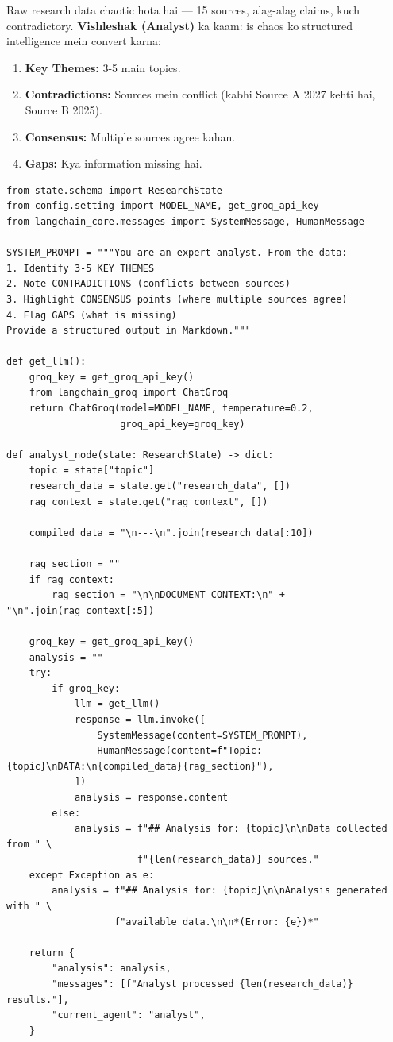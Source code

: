 \documentclass[11pt, a4paper]{article}
\begin{document}
\begin{storybox}
Raw research data chaotic hota hai --- 15 sources, alag-alag claims, kuch contradictory. \textbf{Vishleshak (Analyst)} ka kaam: is chaos ko structured intelligence mein convert karna:

\begin{enumerate}[label=\textcolor{accentpurple}{\arabic*.}]
\item \textbf{Key Themes:} 3-5 main topics.
\item \textbf{Contradictions:} Sources mein conflict (kabhi Source A 2027 kehti hai, Source B 2025).
\item \textbf{Consensus:} Multiple sources agree kahan.
\item \textbf{Gaps:} Kya information missing hai.
\end{enumerate}
\end{storybox}

\begin{lstlisting}[style=pythonstyle, caption={agents/analyst.py --- Poora Code}]
from state.schema import ResearchState
from config.setting import MODEL_NAME, get_groq_api_key
from langchain_core.messages import SystemMessage, HumanMessage

SYSTEM_PROMPT = """You are an expert analyst. From the data:
1. Identify 3-5 KEY THEMES
2. Note CONTRADICTIONS (conflicts between sources)
3. Highlight CONSENSUS points (where multiple sources agree)
4. Flag GAPS (what is missing)
Provide a structured output in Markdown."""

def get_llm():
    groq_key = get_groq_api_key()
    from langchain_groq import ChatGroq
    return ChatGroq(model=MODEL_NAME, temperature=0.2,
                    groq_api_key=groq_key)

def analyst_node(state: ResearchState) -> dict:
    topic = state["topic"]
    research_data = state.get("research_data", [])
    rag_context = state.get("rag_context", [])

    compiled_data = "\n---\n".join(research_data[:10])

    rag_section = ""
    if rag_context:
        rag_section = "\n\nDOCUMENT CONTEXT:\n" + "\n".join(rag_context[:5])

    groq_key = get_groq_api_key()
    analysis = ""
    try:
        if groq_key:
            llm = get_llm()
            response = llm.invoke([
                SystemMessage(content=SYSTEM_PROMPT),
                HumanMessage(content=f"Topic: {topic}\nDATA:\n{compiled_data}{rag_section}"),
            ])
            analysis = response.content
        else:
            analysis = f"## Analysis for: {topic}\n\nData collected from " \
                       f"{len(research_data)} sources."
    except Exception as e:
        analysis = f"## Analysis for: {topic}\n\nAnalysis generated with " \
                   f"available data.\n\n*(Error: {e})*"

    return {
        "analysis": analysis,
        "messages": [f"Analyst processed {len(research_data)} results."],
        "current_agent": "analyst",
    }
\end{lstlisting}
\end{document}
